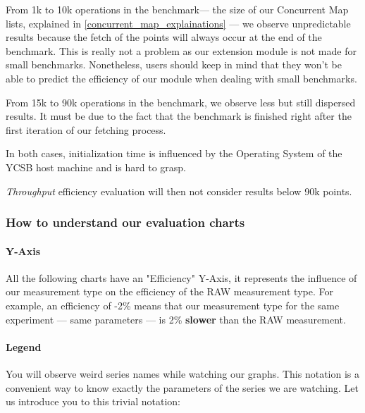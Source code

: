 \documentclass[a4paper,11pt]{report}
\begin{document}
From 1k to 10k operations in the benchmark--- the size of our Concurrent Map lists, explained in \ref{concurrent_map_explainations} --- we observe unpredictable results because the fetch of the points will always occur at the end of the benchmark. This is really not a problem as our extension module is not made for small benchmarks. Nonetheless, users should keep in mind that they won't be able to predict the efficiency of our module when dealing with small benchmarks.

From 15k to 90k operations in the benchmark, we observe less but still dispersed results. It must be due to the fact that the benchmark is finished right after the first iteration of our fetching process.

In both cases, initialization time is influenced by the Operating System of the YCSB host machine and is hard to grasp.

\textit{Throughput} efficiency evaluation will then not consider results below 90k points.

\subsubsection{How to understand our evaluation charts}

\paragraph{Y-Axis}

All the following charts have an "Efficiency" Y-Axis, it represents the influence of our measurement type on the efficiency of the RAW measurement type. For example, an efficiency of -2\% means that our measurement type for the same experiment --- same parameters --- is 2\% \textbf{slower} than the RAW measurement.

\paragraph{Legend} You will observe weird series names while watching our graphs. This notation is a convenient way to know exactly the parameters of the series we are watching. Let us introduce you to this trivial notation:
\end{document}
